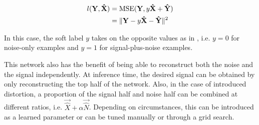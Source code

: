 \begin{align}
l(\mathbf{Y}, \mathbf{\hat{X}}) &= \text{MSE} (\mathbf{Y}, y\mathbf{\hat{X}}+\mathbf{\hat{Y}})\\
&= \lVert \mathbf{Y} - y\mathbf{\hat{X}}-\mathbf{\hat{Y}} \rVert^{2}
\end{align}

In this case, the soft label $y$ takes on the opposite values as in \cite{stow}, i.e. $y=0$ for noise-only examples and $y=1$ for signal-plus-noise examples.

This network also has the benefit of being able to reconstruct both the noise and the signal independently. At inference time, the desired signal can be obtained by only reconstructing the top half of the network. Also, in the case of introduced distortion, a proportion of the signal half and noise half can be combined at different ratios, i.e. $\vec{\hat{X}}+\alpha \vec{\hat{N}}$. Depending on circumstances, this can be introduced as a learned parameter or can be tuned manually or through a grid search.


